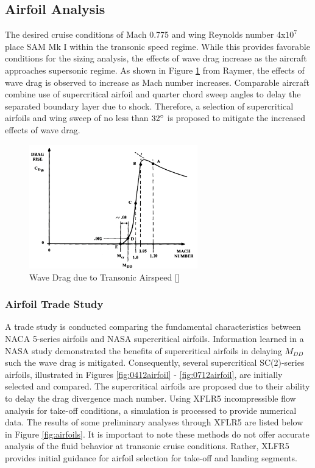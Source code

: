 \subsection{Airfoil Analysis}
The desired cruise conditions of Mach 0.775 and wing Reynolds number 4x$10^7$ place SAM Mk I within the transonic speed regime.  While this provides favorable conditions for the sizing analysis, the effects of wave drag increase as the aircraft approaches supersonic regime.  As shown in Figure \ref{fig:transonic} from Raymer\cite{raymer}, the effects of wave drag is observed to increase as Mach number increases.  Comparable aircraft combine use of supercritical airfoil and quarter chord sweep angles to delay the separated boundary layer due to shock.  Therefore, a selection of supercritical airfoils and wing sweep of no less than $32\degree$ is proposed to mitigate the increased effects of wave drag. 

\begin{figure}[!h]
    \centering
    \includegraphics[width=0.65\textwidth]{Photos/wavedragduetotransonic.png}
    \caption{Wave Drag due to Transonic Airspeed [\color{blue}{3}]}
    \label{fig:transonic}
\end{figure}

\subsubsection{Airfoil Trade Study}
A trade study is conducted comparing the fundamental characteristics between NACA 5-series airfoils and NASA supercritical airfoils.  Information learned in a NASA study \cite{supercritical} demonstrated the benefits of supercritical airfoils in delaying $M_{DD}$ such the wave drag is mitigated.  Consequently, several supercritical SC(2)-series airfoils, illustrated in Figures \ref{fig:0412airfoil} - \ref{fig:0712airfoil}, are initially selected and compared.  The supercritical airfoils are proposed due to their ability to delay the drag divergence mach number.  Using XFLR5 \cite{xflr5} incompressible flow analysis for take-off conditions, a simulation is processed to provide numerical data.  The results of some preliminary analyses through XFLR5 are listed below in Figure \ref{fig:airfoils}.  It is important to note these methods do not offer accurate analysis of the fluid behavior at transonic cruise conditions.  Rather, XLFR5 provides initial guidance for airfoil selection for take-off and landing segments.
\newpage

